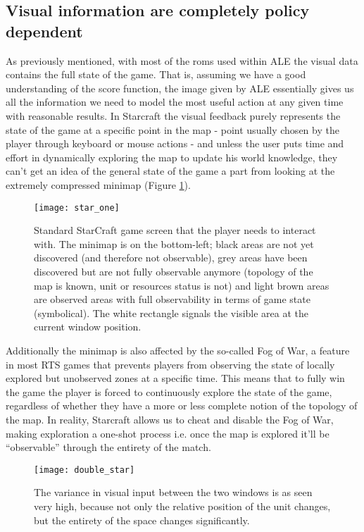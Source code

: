 \subsection{Visual information are completely policy dependent}

As previously mentioned, with most of the roms used within ALE the visual data
contains the full state of the game. That is, assuming we have a good
understanding of the score function, the image given by ALE essentially gives us
all the information we need to model the most useful action at any given time
with reasonable results. In Starcraft the visual feedback purely represents the
state of the game at a specific point in the map - point usually chosen by the
player through keyboard or mouse actions - and unless the user puts time and
effort in dynamically exploring the map to update his world knowledge, they
can't get an idea of the general state of the game a part from looking at the
extremely compressed minimap (Figure \ref{fig:one_star}).

\begin{figure}[h]
    \centering
    \texttt{[image: star\_one]}
    \caption{Standard StarCraft game screen that the player needs to interact
      with. The minimap is on the bottom-left; black areas are not yet
      discovered (and therefore not observable), grey areas have been discovered
      but are not fully observable anymore (topology of the map is known, unit
      or resources status is not) and light brown areas are observed areas with
      full observability in terms of game state (symbolical). The white
      rectangle signals the visible area at the current window position.}
    \label{fig:one_star}
\end{figure}

Additionally the minimap is also affected by the so-called Fog of War, a feature
in most RTS games that prevents players from observing the state of locally
explored but unobserved zones at a specific time. This means that to fully win
the game the player is forced to continuously explore the state of the game,
regardless of whether they have a more or less complete notion of the topology
of the map. In reality, Starcraft allows us to cheat and disable the Fog of War,
making exploration a one-shot process i.e. once the map is explored it’ll be
“observable” through the entirety of the match.

\begin{figure}[h]
    \centering
    \texttt{[image: double\_star]}
    \caption{The variance in visual input between the two windows is as seen
      very high, because not only the relative position of the unit changes, but
      the entirety of the space changes significantly.}
    \label{fig:double_star}
\end{figure}

